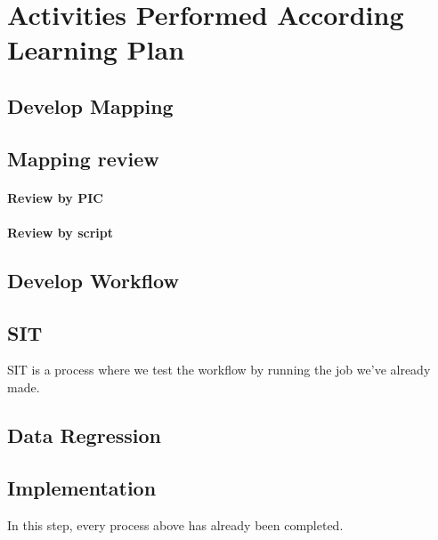 \section{Activities Performed According Learning Plan}
\subsection{Develop Mapping}
\subsection{Mapping review}
\paragraph{Review by PIC}
\paragraph{Review by script}
\subsection{Develop Workflow}
\subsection{SIT}
SIT is a process where we test the workflow by running the job we've already made.
\subsection{Data Regression}
\subsection{Implementation}
In this step, every process above has already been completed.